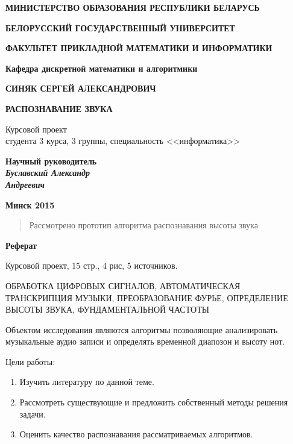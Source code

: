 \documentclass[oneside, final, 14pt]{extarticle}
\begin{document}
\begin{titlepage}


\centerline{\bf МИНИСТЕРСТВО ОБРАЗОВАНИЯ РЕСПУБЛИКИ БЕЛАРУСЬ}
\bigskip
\bigskip
\centerline{\bf БЕЛОРУССКИЙ ГОСУДАРСТВЕННЫЙ УНИВЕРСИТЕТ}
\bigskip
\bigskip
\centerline{\bf ФАКУЛЬТЕТ ПРИКЛАДНОЙ МАТЕМАТИКИ И ИНФОРМАТИКИ}
\bigskip
\bigskip
\centerline{\bf Кафедра дискретной математики и алгоритмики}
\vfill
\vfill
\vfill
\centerline{\bf СИНЯК СЕРГЕЙ АЛЕКСАНДРОВИЧ}
\bigskip
\bigskip
\centerline{\large \bf РАСПОЗНАВАНИЕ ЗВУКА}
\vfill
\begin{centering}
  {
  Курсовой проект \\
  студента 3 курса, 3 группы, специальность <<информатика>> \\}
\end{centering}
\vfill
\vfill
\hfill
\begin{minipage}{0.35\textwidth}
  {\bf Научный руководитель \\
  {\small{\it Буславский Александр \\ Андреевич}}}
\end{minipage}
\vfill
\vfill
\centerline{\large \bf Минск 2015}

\restoregeometry

\end{titlepage}

\begin{abstract}
	Рассмотрено прототип алгоритма распознавания высоты звука
\end{abstract}

\setcounter{page}{2}

\cleardoublepage

\centerline{\bf Реферат}

Курсовой проект, 15 стр., 4 рис, 5 источников.

ОБРАБОТКА ЦИФРОВЫХ СИГНАЛОВ, АВТОМАТИЧЕСКАЯ ТРАНСКРИПЦИЯ МУЗЫКИ,
ПРЕОБРАЗОВАНИЕ ФУРЬЕ, ОПРЕДЕЛЕНИЕ ВЫСОТЫ ЗВУКА, ФУНДАМЕНТАЛЬНОЙ
ЧАСТОТЫ

Объектом исследования являются алгоритмы позволяющие анализировать
музыкальные аудио записи и определять временной диапозон и высоту
нот.

Цели работы:
\begin{enumerate}
	\item Изучить литературу по данной теме.
	\item Рассмотреть существующие и предложить собственный методы решения
	задачи.
	\item Оценить качество распознавания рассматриваемых алгоритмов.
\end{enumerate}
\end{document}
